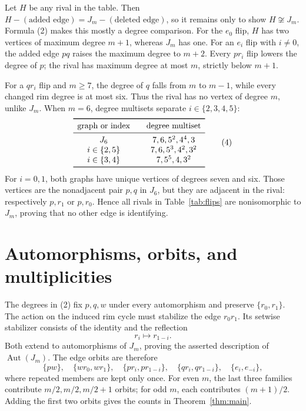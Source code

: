 \documentclass[11pt]{article}
\newcommand{\Aut}{\operatorname{Aut}}
\begin{document}
Let $H$ be any rival in the table.  Then
$H-(\text{added edge})=J_m-(\text{deleted edge})$, so it remains only to
show $H\not\cong J_m$.  Formula (2) makes this mostly a degree comparison.
For the $e_0$ flip, $H$ has two vertices of maximum degree $m+1$, whereas
$J_m$ has one.  For an $e_i$ flip with $i\ne0$, the added edge $pq$ raises
the maximum degree to $m+2$.  Every $pr_i$ flip lowers the degree of $p$;
the rival has maximum degree at most $m$, strictly below $m+1$.

For a $qr_i$ flip and $m\geq7$, the degree of $q$ falls from $m$ to
$m-1$, while every changed rim degree is at most six.  Thus the rival has
no vertex of degree $m$, unlike $J_m$.  When $m=6$, degree multisets
separate $i\in\{2,3,4,5\}$:
\[
\begin{array}{c@{\qquad}c}
\toprule
\text{graph or index}&\text{degree multiset}\\
\midrule
J_6&7,6,5^2,4^4,3\\
i\in\{2,5\}&7,6,5^3,4^2,3^2\\
i\in\{3,4\}&7,5^5,4,3^2\\
\bottomrule
\end{array}                                                   \tag{4}
\]
For $i=0,1$, both graphs have unique vertices of degrees seven and six.
Those vertices are the nonadjacent pair $p,q$ in $J_6$, but they are
adjacent in the rival: respectively $p,r_1$ or $p,r_0$.  Hence all rivals
in Table~\ref{tab:flips} are nonisomorphic to $J_m$, proving that no other
edge is identifying.

\section{Automorphisms, orbits, and multiplicities}

The degrees in (2) fix $p,q,w$ under every automorphism and preserve
$\{r_0,r_1\}$.  The action on the induced rim cycle must stabilize the
edge $r_0r_1$.  Its setwise stabilizer consists of the identity and the
reflection
\[
 r_i\longmapsto r_{1-i}.
\]
Both extend to automorphisms of $J_m$, proving the asserted description of
$\Aut(J_m)$.  The edge orbits are therefore
\[
 \{pw\},\quad \{wr_0,wr_1\},\quad
 \{pr_i,pr_{1-i}\},\quad
 \{qr_i,qr_{1-i}\},\quad
 \{e_i,e_{-i}\},                                      \tag{5}
\]
where repeated members are kept only once.  For even $m$, the last three
families contribute $m/2,m/2,m/2+1$ orbits; for odd $m$, each contributes
$(m+1)/2$.  Adding the first two orbits gives the counts in
Theorem~\ref{thm:main}.
\end{document}
